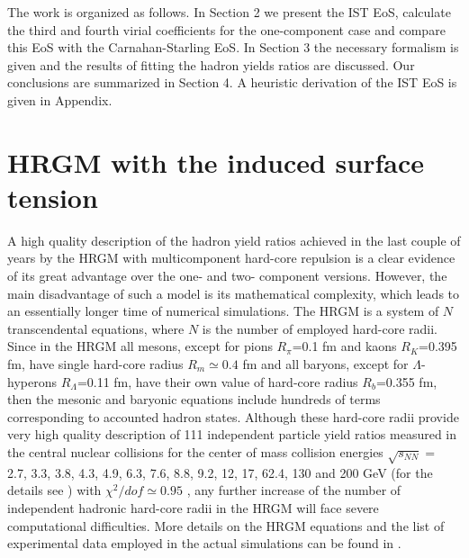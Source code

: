\documentclass[12pt]{article}
\begin{document}
The work is organized as follows. In Section 2 we present the IST EoS, calculate the third and fourth virial coefficients for the one-component case and compare this EoS  with the Carnahan-Starling EoS.  
In Section 3 the necessary formalism is given and the results of fitting the hadron yields ratios are discussed. 
Our conclusions are summarized in Section 4.  A heuristic derivation of  the IST EoS is given in Appendix.



\section{HRGM with the induced surface tension}

A high quality description of  the hadron yield ratios achieved in the last couple of years 
by the  HRGM with multicomponent  hard-core repulsion   is a clear   evidence of its great advantage over the one- and two- component versions.
However, the main disadvantage of  such a  model  is its mathematical complexity, which leads 
to  an essentially longer time of numerical simulations. 
The HRGM \cite{Veta14} is a system of $N$  transcendental equations, where $N$ is the number of  employed  hard-core radii.
Since  in the   HRGM all mesons, except for pions $R_\pi$=0.1 fm and kaons $R_K$=0.395 fm, have single hard-core radius  $R_m \simeq 0.4$ fm  and all baryons, except for 
$\Lambda$-hyperons  $R_{\Lambda}$=0.11 fm, have their own value of hard-core radius $R_{b}$=0.355 fm, then the mesonic and baryonic equations include hundreds of  terms corresponding to accounted hadron states. 
Although these hard-core radii  provide   very high quality description of  111  independent particle yield ratios 
measured in the  central nuclear collisions  for the center of mass collision energies   $\sqrt{s_{NN}} = $ 2.7, 3.3, 3.8, 4.3, 4.9, 6.3, 7.6, 8.8, 9.2, 12, 17, 62.4, 130 and 200 GeV (for the details see  \cite{Horn,SFO,Veta14}) with 
$\chi^2/dof \simeq 0.95$ \cite{Veta14},
any further  increase of  the number of  independent  hadronic hard-core radii in the HRGM  will face 
severe computational difficulties.
 More details on  the HRGM equations and the list of experimental data   employed  in the  actual simulations   can be found in  \cite{Horn,KABOliinychenko:12,SFO,Veta14}.
 
\end{document}
